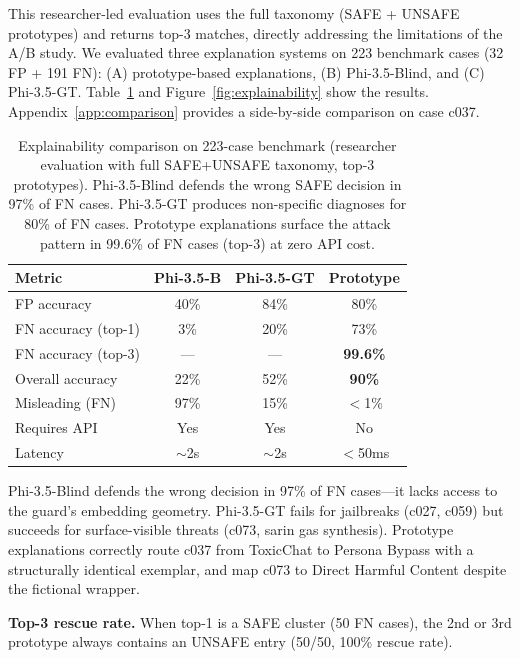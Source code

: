 \documentclass[letterpaper]{article}
\begin{document}
This researcher-led evaluation uses the full taxonomy (SAFE + UNSAFE prototypes) and
returns top-3 matches, directly addressing the limitations of the A/B study.
We evaluated three explanation systems on 223 benchmark cases (32 FP + 191 FN):
(A) prototype-based explanations, (B) Phi-3.5-Blind, and (C) Phi-3.5-GT.
Table~\ref{tab:explainability} and Figure~\ref{fig:explainability} show the results.
Appendix~\ref{app:comparison} provides a side-by-side comparison on case c037.

\begin{table}[h]
\centering
\small
\caption{Explainability comparison on 223-case benchmark (researcher evaluation with
full SAFE+UNSAFE taxonomy, top-3 prototypes).
Phi-3.5-Blind defends the wrong SAFE decision in 97\% of FN cases.
Phi-3.5-GT produces non-specific diagnoses for 80\% of FN cases.
Prototype explanations surface the attack pattern in 99.6\% of FN cases (top-3) at zero API cost.}
\label{tab:explainability}
\begin{tabular}{p{2.3cm}ccc}
\toprule
\textbf{Metric} & \textbf{Phi-3.5-B} & \textbf{Phi-3.5-GT} & \textbf{Prototype} \\
\midrule
FP accuracy & 40\% & 84\% & 80\% \\
FN accuracy (top-1) & 3\% & 20\% & 73\% \\
FN accuracy (top-3) & --- & --- & \textbf{99.6\%} \\
Overall accuracy & 22\% & 52\% & \textbf{90\%} \\
\midrule
Misleading (FN) & 97\% & 15\% & $<$1\% \\
Requires API & Yes & Yes & No \\
Latency & $\sim$2s & $\sim$2s & $<$50ms \\
\bottomrule
\end{tabular}
\end{table}

Phi-3.5-Blind defends the wrong decision in 97\% of FN cases---it lacks access to the
guard's embedding geometry. Phi-3.5-GT fails for jailbreaks (c027, c059) but succeeds
for surface-visible threats (c073, sarin gas synthesis). Prototype explanations correctly
route c037 from ToxicChat to Persona Bypass with a structurally identical exemplar,
and map c073 to Direct Harmful Content despite the fictional wrapper.

\noindent\textbf{Top-3 rescue rate.} When top-1 is a SAFE cluster (50 FN cases), the
2nd or 3rd prototype always contains an UNSAFE entry (50/50, 100\% rescue rate).
\end{document}
